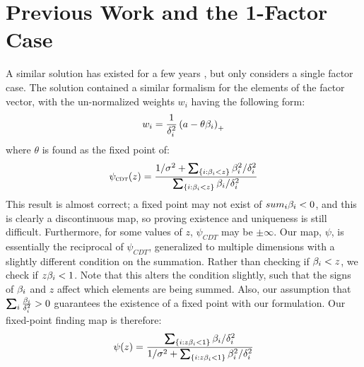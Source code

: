 \documentclass[12pt,leqno,letterpaper]{article}
\begin{document}
\section{Previous Work and the 1-Factor Case}
A similar solution has existed for a few years \cite{clarke2011}, but only considers a single factor case.  
The solution contained a similar formalism for the elements of the factor vector, with the un-normalized weights $w_i$ having the following form:
\begin{align}
w_i = \frac{1}{\delta_i^2}\left(a - \theta \beta_i\right)_+
\end{align}
where $\theta$ is found as the fixed point of:
\begin{align}
 \psi_{\textsc{cdt}}(z) = \frac{1/\gs^2 + \sum_{\{i: \gb_i<z\}} \gb_i^2/\gd_i^2 }{ \sum_{\{i: \gb_i<z\}} \gb_i/\gd_i^2 }
\end{align}
This result is almost correct; a fixed point may not exist of $sum_i \beta_i<0$, and this is clearly a discontinuous map, so proving existence and uniqueness is still difficult.  Furthermore, for some values of $z$, $\psi_{CDT}$ may be $\pm \infty$.  Our map, $\psi$, is essentially the reciprocal of $\psi_{CDT}$, generalized to multiple dimensions with a slightly different condition on the summation.  Rather than checking if $\beta_i<z$, we check if $z \beta_i<1$.  Note that this alters the condition slightly, such that the signs of $\beta_i$ and $z$ affect which elements are being summed.  Also, our assumption that $\sum_i \frac{\gb_i}{\gd_i^2}>0$ guarantees the existence of a fixed point with our formulation.  Our fixed-point finding map is therefore:
\begin{align}\label{psi_1}
\psi(z) = \frac{\sum_{\{i:z\gb_i<1\}} \gb_i/\gd_i^2}{1/\gs^2+ \sum_{ \{i:z\gb_i<1\} } \gb_i^2/\gd_i^2}
\end{align}
\end{document}
